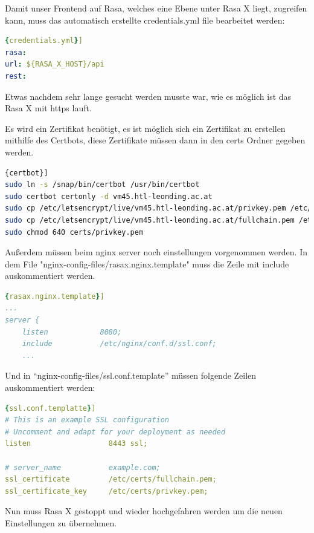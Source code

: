 Damit unser Frontend auf Rasa, welches eine Ebene unter Rasa X liegt, zugreifen kann, muss das automatisch erstellte credentials.yml file bearbeitet werden:

\begin{lstlisting}[language=yaml,label={lst:rasaXCred},caption={credentials.yml}]{credentials.yml}]
rasa:
url: ${RASA_X_HOST}/api
rest:
\end{lstlisting}

Etwas nachdem sehr lange gesucht werden musste war, wie es möglich ist das Rasa X mit https lauft.

Es wird ein Zertifikat benötigt, es ist möglich sich ein Zertifikat zu erstellen mithilfe des Certbots\cite{certbot}, diese Zertifikate müssen dann in den certs Ordner gegeben werden.

\begin{lstlisting}[language=bash,label={lst:certbot},caption={Install certbot and create certificates}]{certbot}]
sudo ln -s /snap/bin/certbot /usr/bin/certbot
sudo certbot certonly -d vm45.htl-leonding.ac.at
sudo cp /etc/letsencrypt/live/vm45.htl-leonding.ac.at/privkey.pem /etc/rasa/certs/
sudo cp /etc/letsencrypt/live/vm45.htl-leonding.ac.at/fullchain.pem /etc/rasa/certs/
sudo chmod 640 certs/privkey.pem
\end{lstlisting}

Außerdem müssen beim nginx server noch einstellungen vorgenommen werden.
In dem File "nginx-config-files/rasax.nginx.template" muss die Zeile mit include auskommentiert werden.
\begin{lstlisting}[language=yaml,label={lst:rasaxnginxtemplate},caption={rasax.nginx.template}]{rasax.nginx.template}]
...
server {
    listen            8080;
    include           /etc/nginx/conf.d/ssl.conf;
    ...
\end{lstlisting}

Und in ``nginx-config-files/ssl.conf.template'' müssen folgende Zeilen auskommentiert werden:
\begin{lstlisting}[language=yaml,label={lst:sslconftemplate},caption={ssl.conf.template}]{ssl.conf.templatte}]
# This is an example SSL configuration
# Uncomment and adapt for your deployment as needed
listen                  8443 ssl;

# server_name           example.com;
ssl_certificate         /etc/certs/fullchain.pem;
ssl_certificate_key     /etc/certs/privkey.pem;
\end{lstlisting}

Nun muss Rasa X gestoppt und wieder hochgefahren werden um die neuen Einstellungen zu übernehmen.

